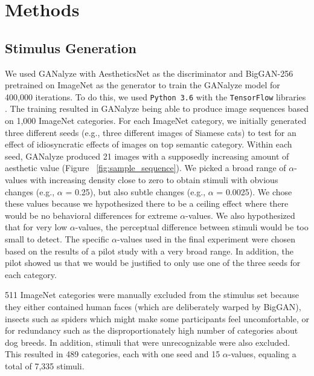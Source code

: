 \documentclass[../main.tex]{subfiles}
\begin{document}
\section{Methods}

	\subsection{Stimulus Generation}
	We used GANalyze with AestheticsNet \parencite{kongPhotoAestheticsRanking2016} as the discriminator and BigGAN-256 \parencite{brockLargeScaleGAN2019} pretrained on ImageNet \parencite{russakovskyImageNetLargeScale2015} as the generator to train the GANalyze model for 400,000 iterations. To do this, we used \texttt{Python 3.6} \parencite{vanrossum2016Python} with the \texttt{TensorFlow} libraries \parencite{abadi2016tensorflow}. The training resulted in GANalyze being able to produce image sequences based on 1,000 ImageNet categories. For each ImageNet category, we initially generated three different seeds (e.g., three different images of Siamese cats) to test for an effect of idiosyncratic effects of images on top semantic category. Within each seed, GANalyze produced 21 images with a supposedly increasing amount of aesthetic value (Figure ~\ref{fig:sample_sequence}). We picked a broad range of $\alpha$-values with increasing density close to zero to obtain stimuli with obvious changes (e.g., $\alpha$ = 0.25), but also subtle changes (e.g., $\alpha$ = 0.0025). We chose these values because we hypothesized there to be a ceiling effect where there would be no behavioral differences for extreme $\alpha$-values. We also hypothesized that for very low $\alpha$-values, the perceptual difference between stimuli would be too small to detect. The specific $\alpha$-values used in the final experiment were chosen based on the results of a pilot study with a very broad range. In addition, the pilot showed us that we would be justified to only use one of the three seeds for each category.
	
	511 ImageNet categories were manually excluded from the stimulus set because they either contained human faces (which are deliberately warped by BigGAN), insects such as spiders which might make some participants feel uncomfortable, or for redundancy such as the disproportionately high number of categories about dog breeds. In addition, stimuli that were unrecognizable were also excluded. This resulted in 489 categories, each with one seed and 15 $\alpha$-values, equaling a total of 7,335 stimuli.
	
\end{document}
